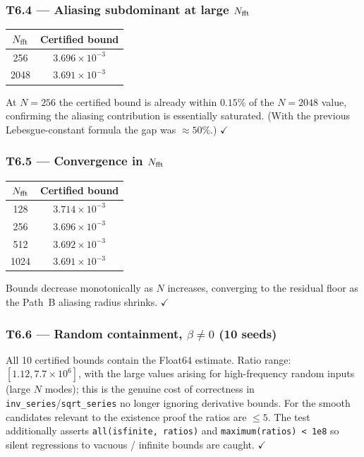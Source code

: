 \documentclass[11pt]{article}
\theoremstyle{definition}
\begin{document}
\subsubsection*{T6.4 --- Aliasing subdominant at large $N_{\rm fft}$}
\begin{center}
\begin{tabular}{cc}
\toprule
$N_{\rm fft}$ & Certified bound \\
\midrule
256  & $3.696\times10^{-3}$ \\
2048 & $3.691\times10^{-3}$ \\
\bottomrule
\end{tabular}
\end{center}
At $N = 256$ the certified bound is already within $0.15\%$ of the
$N = 2048$ value, confirming the aliasing contribution is essentially
saturated.  (With the previous Lebesgue-constant formula the gap was
$\approx 50\%$.) $\checkmark$

\subsubsection*{T6.5 --- Convergence in $N_{\rm fft}$}
\begin{center}
\begin{tabular}{cc}
\toprule
$N_{\rm fft}$ & Certified bound \\
\midrule
128  & $3.714\times10^{-3}$ \\
256  & $3.696\times10^{-3}$ \\
512  & $3.692\times10^{-3}$ \\
1024 & $3.691\times10^{-3}$ \\
\bottomrule
\end{tabular}
\end{center}
Bounds decrease monotonically as $N$ increases, converging to the residual
floor as the Path~B aliasing radius shrinks.  $\checkmark$

\subsubsection*{T6.6 --- Random containment, $\beta\neq 0$ (10 seeds)}
All 10 certified bounds contain the Float64 estimate.  Ratio range:
$[1.12, 7.7\times10^{6}]$, with the large values arising for high-frequency
random inputs (large $N$ modes); this is the genuine cost of correctness
in \texttt{inv\_series}/\texttt{sqrt\_series} no longer ignoring derivative
bounds.  For the smooth candidates relevant to the existence proof the ratios
are $\le 5$.  The test additionally asserts \texttt{all(isfinite, ratios)} and
\texttt{maximum(ratios) < 1e8} so silent regressions to vacuous / infinite
bounds are caught.  $\checkmark$
\end{document}
